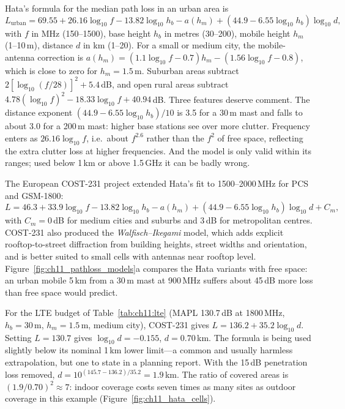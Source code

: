 
Hata's formula for the median path loss in an urban area is
\begin{equation}
L_{\text{urban}}=69.55+26.16\log_{10}f-13.82\log_{10}h_b-a(h_m)+(44.9-6.55\log_{10}h_b)\log_{10}d,
\label{eq:ch11:hata}
\end{equation}
with $f$ in MHz (150--1500), base height $h_b$ in metres (30--200), mobile height $h_m$ (1--10\,m),
distance $d$ in km (1--20). For a small or medium city, the mobile-antenna correction is
$a(h_m)=(1.1\log_{10}f-0.7)h_m-(1.56\log_{10}f-0.8)$, which is close to zero for $h_m=1.5$\,m.
Suburban areas subtract $2[\log_{10}(f/28)]^2+5.4$\,dB, and open rural areas subtract
$4.78(\log_{10}f)^2-18.33\log_{10}f+40.94$\,dB. Three features deserve comment. The distance
exponent $(44.9-6.55\log_{10}h_b)/10$ is 3.5 for a 30\,m mast and falls to about 3.0 for a 200\,m
mast: higher base stations see over more clutter. Frequency enters as $26.16\log_{10}f$, i.e.\
about $f^{2.6}$ rather than the $f^2$ of free space, reflecting the extra clutter loss at higher
frequencies. And the model is only valid within its ranges; used below 1\,km or above 1.5\,GHz it
can be badly wrong.

The European COST-231 project extended Hata's fit to 1500--2000\,MHz for PCS and GSM-1800:
\begin{equation}
L=46.3+33.9\log_{10}f-13.82\log_{10}h_b-a(h_m)+(44.9-6.55\log_{10}h_b)\log_{10}d+C_m,
\end{equation}
with $C_m=0$\,dB for medium cities and suburbs and 3\,dB for metropolitan centres. COST-231 also
produced the \emph{Walfisch--Ikegami} model, which adds explicit rooftop-to-street diffraction
from building heights, street widths and orientation, and is better suited to small cells with
antennas near rooftop level. Figure~\ref{fig:ch11_pathloss_models}a compares the Hata variants
with free space: an urban mobile 5\,km from a 30\,m mast at 900\,MHz suffers about 45\,dB more loss
than free space would predict.

\begin{worked}
For the LTE budget of Table~\ref{tab:ch11:lte} (MAPL 130.7\,dB at 1800\,MHz, $h_b=30$\,m,
$h_m=1.5$\,m, medium city), COST-231 gives $L=136.2+35.2\log_{10}d$. Setting $L=130.7$ gives
$\log_{10}d=-0.155$, $d=0.70$\,km. The formula is being used slightly below its nominal 1\,km
lower limit---a common and usually harmless extrapolation, but one to state in a planning report.
With the 15\,dB penetration loss removed, $d=10^{(145.7-136.2)/35.2}=1.9$\,km. The ratio of
covered areas is $(1.9/0.70)^2\approx7$: indoor coverage costs seven times as many sites as
outdoor coverage in this example (Figure~\ref{fig:ch11_hata_cells}).
\end{worked}

